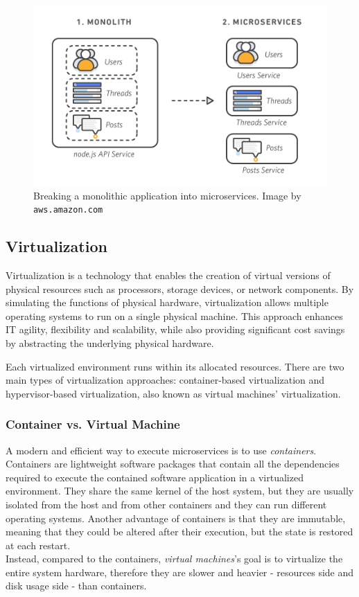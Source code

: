 \begin{figure}[ht]
  \centering
  \includegraphics[scale=0.6]{chapters/02/assets/monolith-microservices.png}
  \caption[Breaking a monolithic application into microservices]{Breaking a monolithic application into microservices. Image by \texttt{aws.amazon.com}}
  \label{fig:monolith-microservices}
\end{figure}

\subsection{Virtualization}

Virtualization is a technology that enables the creation of virtual versions of physical resources such as processors, storage devices, or network components. By simulating the functions of physical hardware, virtualization allows multiple operating systems to run on a single physical machine. This approach enhances IT agility, flexibility and scalability, while also providing significant cost savings by abstracting the underlying physical hardware.~\cite{virtualization-aws}

Each virtualized environment runs within its allocated resources. There are two main types of virtualization approaches: container-based virtualization and hypervisor-based virtualization, also known as virtual machines' virtualization.

\subsubsection{Container vs. Virtual Machine}

A modern and efficient way to execute microservices is to use \textit{containers}. \\
Containers are lightweight software packages that contain all the dependencies required to execute the contained software application in a virtualized environment. They share the same kernel of the host system, but they are usually isolated from the host and from other containers and they can run different operating systems. Another advantage of containers is that they are immutable, meaning that they could be altered after their execution, but the state is restored at each restart.\\
Instead, compared to the containers, \textit{virtual machines}'s goal is to virtualize the entire system hardware, therefore they are slower and heavier - resources side and disk usage side - than containers.

